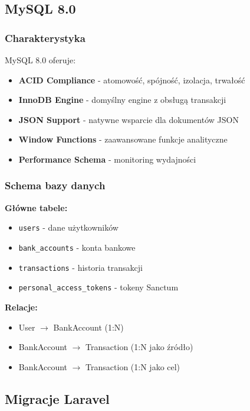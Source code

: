     \subsection{MySQL 8.0}

    \subsubsection{Charakterystyka}
    MySQL 8.0 oferuje:

    \begin{itemize}
        \item \textbf{ACID Compliance} - atomowość, spójność, izolacja, trwałość
        \item \textbf{InnoDB Engine} - domyślny engine z obsługą transakcji
        \item \textbf{JSON Support} - natywne wsparcie dla dokumentów JSON
        \item \textbf{Window Functions} - zaawansowane funkcje analityczne
        \item \textbf{Performance Schema} - monitoring wydajności
    \end{itemize}

    \subsubsection{Schema bazy danych}

    \textbf{Główne tabele:}
    \begin{itemize}
        \item \texttt{users} - dane użytkowników
        \item \texttt{bank\_accounts} - konta bankowe
        \item \texttt{transactions} - historia transakcji
        \item \texttt{personal\_access\_tokens} - tokeny Sanctum
    \end{itemize}

    \textbf{Relacje:}
    \begin{itemize}
        \item User $\rightarrow$ BankAccount (1:N)
        \item BankAccount $\rightarrow$ Transaction (1:N jako źródło)
        \item BankAccount $\rightarrow$ Transaction (1:N jako cel)
    \end{itemize}

    \subsection{Migracje Laravel}

